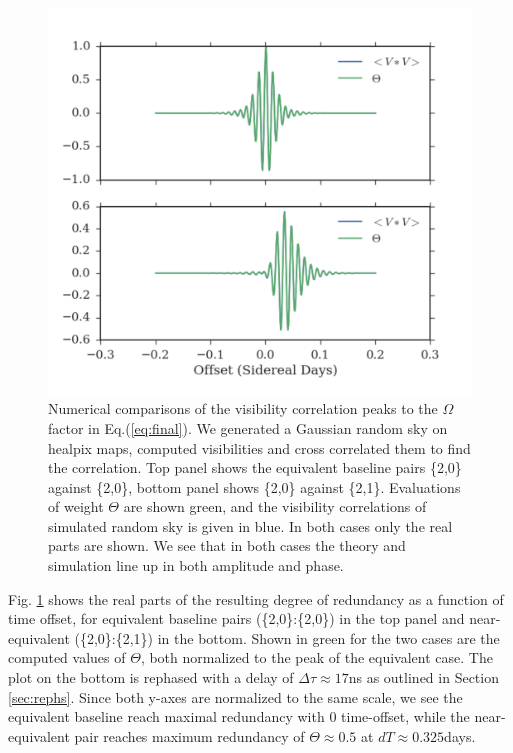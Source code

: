 \documentclass[twocolumn,apj,numberedappendix]{emulateapj}
\renewcommand\[{\begin{equation}}
\renewcommand\]{\end{equation}}
\begin{document}
\begin{figure}[h]
\includegraphics[width=\linewidth]{numerics}

\caption{Numerical comparisons of the visibility correlation peaks to the $\Omega$ factor in Eq.(\ref{eq:final}). We generated a Gaussian random sky on healpix maps, computed visibilities and cross correlated them to find the correlation.  Top panel shows the equivalent baseline pairs \{2,0\} against \{2,0\}, bottom panel shows \{2,0\} against \{2,1\}.  Evaluations of weight $\Theta$ are shown green, and the visibility correlations of simulated random sky is given in blue. In both cases only the real parts are shown. We see that in both cases the theory and simulation line up in both amplitude and phase.}
\label{fig:numerics}
\end{figure}

Fig. \ref{fig:numerics} shows the real parts of the resulting degree of redundancy as a function of time offset, for equivalent baseline pairs (\{2,0\}:\{2,0\}) in the top panel and near-equivalent (\{2,0\}:\{2,1\}) in the bottom. Shown in green for the two cases are the computed values of $\Theta$, both normalized to the peak of the equivalent case. The plot on the bottom is rephased with a delay of $\Delta\tau\approx17$ns as outlined in Section \ref{sec:rephs}. Since both y-axes are normalized to the same scale, we see the equivalent baseline reach maximal redundancy with 0 time-offset, while the near-equivalent pair reaches maximum redundancy of $\Theta\approx0.5$ at $dT\approx0.325$days. 
\end{document}

